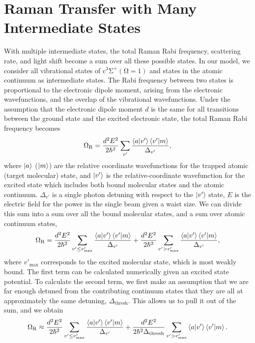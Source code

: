 \documentclass[aps,prx,secnumarabic,amsmath,amssymb,10pt,superscriptaddress]{revtex4-2}
\begin{document}
\section{Raman Transfer with Many Intermediate States} \label{sm:sect_2}
With multiple intermediate states, the total Raman Rabi frequency, scattering rate, and light shift become a sum over all these possible states. In our model, we consider all vibrational states of $ \mathrm{c^3\Sigma^+(\Omega = 1)} $ and states in the atomic continuum as intermediate states. The Rabi frequency between two states is proportional to the electronic dipole moment, arising from the electronic wavefunctions, and the overlap of the vibrational wavefunctions. Under the assumption that the electronic dipole moment $ d $ is the same for all transitions between the ground state and the excited electronic state, the total Raman Rabi frequency becomes
\begin{equation}
  \Omega_{\rm R} = \frac{d^2E^2}{2\hbar^2} \displaystyle\sum_{v'} \frac{\braket{a|v'}\braket{v'|m}}{\Delta_{v'}},
\end{equation}
where $\ket{a}$ ($\ket{m}$) are the relative coordinate wavefunctions for the trapped atomic (target molecular) state, and $\ket{v'}$ is the relative-coordinate wavefunction for the excited state which includes both bound molecular states and the atomic continuum. $\Delta_{v'}$ is a single photon detuning with respect to the $\ket{v'}$ state, $ E $ is the electric field for the power in the single beam given a waist size. We can divide this sum into a sum over all the bound molecular states, and a sum over atomic continuum states,
\begin{equation}
  \Omega_{\rm R} = \frac{d^2E^2}{2\hbar^2}\displaystyle\sum_{v' \leq v'_{\text{max}}} \frac{\braket{a|v'}\braket{v'|m}}{\Delta_{v'}} +  \frac{d^2E^2}{2\hbar^2}\displaystyle\sum_{v' > v'_{\text{max}}} \frac{\braket{a|v'}\braket{v'|m}}{\Delta_{v'}},
\end{equation}
where $ v'_{\text{max}}$ corresponds to the excited molecular state, which is most weakly bound. The first term can be calculated numerically given an excited state potential. To calculate the second term, we first make an assumption that we are far enough detuned from the contributing continuum states that they are all at approximately the same detuning, $ \Delta_{\text{thresh}}$. This allows us to pull it out of the sum, and we obtain
\begin{equation}
  \Omega_{\rm R} \approx \frac{d^2E^2}{2\hbar^2}\displaystyle\sum_{v' \leq v'_{\text{max}}} \frac{\braket{a|v'}\braket{v'|m}}{\Delta_{v'}} +  \frac{d^2E^2}{2\hbar^2\Delta_{\text{thresh}}}\displaystyle\sum_{v' > v'_{\text{max}}} \braket{a|v'}\braket{v'|m} . \label{rabifreq}
\end{equation}
\end{document}
